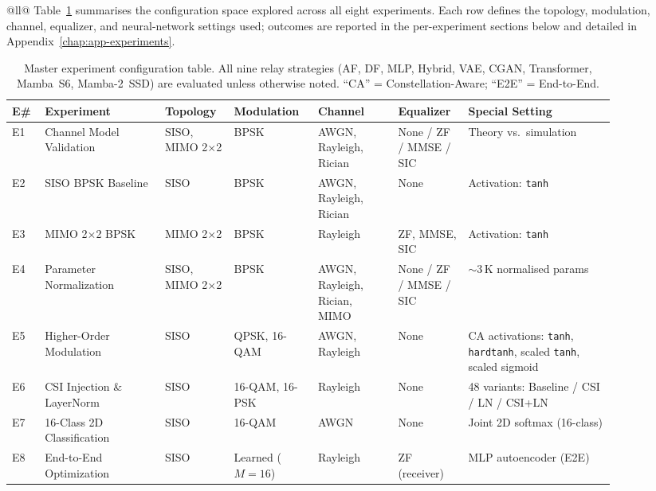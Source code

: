 {\begin{longtable}[]{@{}ll@{}}
Table~\ref{tbl:master-config} summarises the configuration space explored across all
eight experiments. Each row defines the topology, modulation, channel, equalizer, and
neural-network settings used; outcomes are reported in the per-experiment sections below
and detailed in Appendix~\ref{chap:app-experiments}.

\begin{table}[H]
\centering
\caption{Master experiment configuration table. All nine relay strategies
(AF, DF, MLP, Hybrid, VAE, CGAN, Transformer, Mamba~S6, Mamba-2~SSD) are evaluated
unless otherwise noted. ``CA'' = Constellation-Aware; ``E2E'' = End-to-End.}
\label{tbl:master-config}
\small
\begin{tabular}{@{}p{0.04\linewidth}p{0.18\linewidth}p{0.10\linewidth}p{0.12\linewidth}p{0.12\linewidth}p{0.10\linewidth}p{0.22\linewidth}@{}}
\toprule
\textbf{E\#} & \textbf{Experiment} & \textbf{Topology} & \textbf{Modulation} & \textbf{Channel} & \textbf{Equalizer} & \textbf{Special Setting} \\
\midrule
E1 & Channel Model Validation & SISO, MIMO 2$\times$2 & BPSK & AWGN, Rayleigh, Rician & None / ZF / MMSE / SIC & Theory vs.\ simulation \\
\midrule
E2 & SISO BPSK Baseline & SISO & BPSK & AWGN, Rayleigh, Rician & None & Activation: \texttt{tanh} \\
\midrule
E3 & MIMO 2$\times$2 BPSK & MIMO 2$\times$2 & BPSK & Rayleigh & ZF, MMSE, SIC & Activation: \texttt{tanh} \\
\midrule
E4 & Parameter Normalization & SISO, MIMO 2$\times$2 & BPSK & AWGN, Rayleigh, Rician, MIMO & None / ZF / MMSE / SIC & $\sim$3\,K normalised params \\
\midrule
E5 & Higher-Order Modulation & SISO & QPSK, 16-QAM & AWGN, Rayleigh & None & CA activations: \texttt{tanh}, \texttt{hardtanh}, scaled \texttt{tanh}, scaled sigmoid \\
\midrule
E6 & CSI Injection \& LayerNorm & SISO & 16-QAM, 16-PSK & Rayleigh & None & 48 variants: Baseline / CSI / LN / CSI+LN \\
\midrule
E7 & 16-Class 2D Classification & SISO & 16-QAM & AWGN & None & Joint 2D softmax (16-class) \\
\midrule
E8 & End-to-End Optimization & SISO & Learned ($M{=}16$) & Rayleigh & ZF (receiver) & MLP autoencoder (E2E) \\
\bottomrule
\end{tabular}
\end{table}


\end{longtable}}
